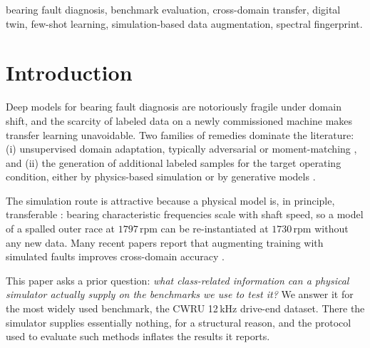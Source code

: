 \documentclass[journal]{IEEEtran}
\begin{document}
\begin{IEEEkeywords}
bearing fault diagnosis, benchmark evaluation, cross-domain transfer, digital
twin, few-shot learning, simulation-based data augmentation, spectral
fingerprint.
\end{IEEEkeywords}

\section{Introduction}
\label{sec:intro}

Deep models for bearing fault diagnosis are notoriously fragile under domain
shift, and the scarcity of labeled data on a newly commissioned machine makes
transfer learning unavoidable. Two families of remedies dominate the
literature: (i) unsupervised domain adaptation, typically adversarial
\cite{ganin2016dann} or moment-matching \cite{sun2016coral}, and (ii) the
generation of additional labeled samples
for the target operating condition, either by physics-based simulation
\cite{ming2026physics, xiao2026sim2real, liu2024twin} or by generative models
\cite{shao2019gan}.

The simulation route is attractive because a physical model is, in principle,
transferable \cite{karniadakis2021piml, tao2019dt}: bearing characteristic
frequencies scale with shaft speed, so a
model of a spalled outer race at $1797$\,rpm can be re-instantiated at
$1730$\,rpm without any new data. Many recent papers report that augmenting
training with simulated faults improves cross-domain accuracy
\cite{liu2024twin, xu2024dt, zhang2023dt, kumar2024dt, ming2026physics,
xiao2026sim2real}.

This paper asks a prior question: \emph{what class-related information can a
physical simulator actually supply on the benchmarks we use to test it?} We
answer it for the most widely used benchmark, the CWRU 12\,kHz drive-end
dataset. There the simulator supplies essentially nothing, for a structural
reason, and the protocol used to evaluate such methods inflates the results it
reports.
\end{document}
